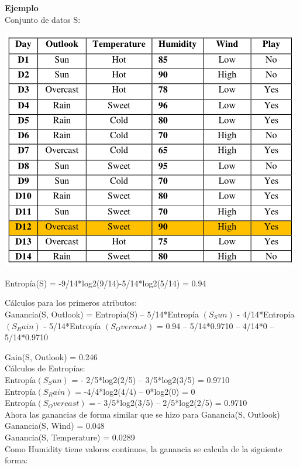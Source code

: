 \documentclass{article}
\begin{document}
 {\bf Ejemplo}\\
 Conjunto de datos S:
\begin{center}
 \includegraphics[scale=0.65]{conjunto}\\
\end{center}

Entropía(S) = -9/14*log2(9/14)-5/14*log2(5/14) = 0.94

Cálculos para los primeros atributos:\\
Ganancia(S, Outlook) = Entropía(S) – 5/14*Entropía $(S_Sun)$
					- 4/14*Entropía $(S_Rain)$
					- 5/14*Entropía $(S_Overcast)$
					= 0.94 – 5/14*0.9710 – 4/14*0 – 5/14*0.9710

			Gain(S, Outlook) = 0.246\\

Cálculos de Entropías:\\
Entropía$(S_Sun)$ = - 2/5*log2(2/5) – 3/5*log2(3/5) = 0.9710\\
Entropía$(S_Rain)$ = -4/4*log2(4/4) – 0*log2(0) = 0\\
Entropía$(S_Overcast)$ = - 3/5*log2(3/5) – 2/5*log2(2/5) = 0.9710\\

Ahora las ganancias de forma similar que se hizo para Ganancia(S, Outlook)\\
Ganancia(S, Wind) = 0.048\\
Ganancia(S, Temperature) = 0.0289\\

Como Humidity tiene valores continuos, la ganancia se calcula de la siguiente forma:\\
\end{document}
